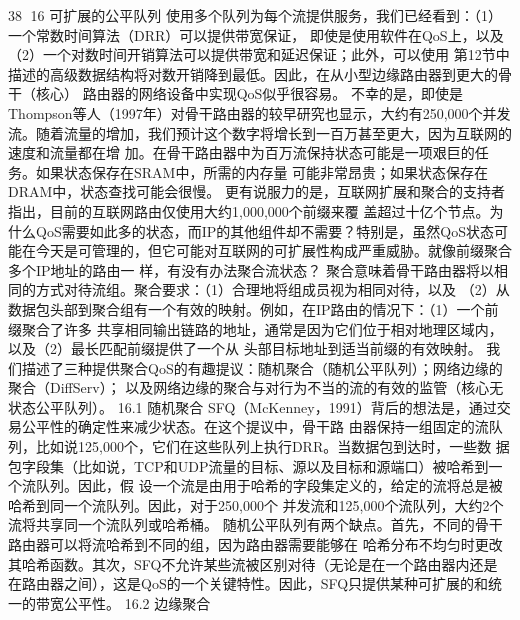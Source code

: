                                                                            38
16 可扩展的公平队列
使用多个队列为每个流提供服务，我们已经看到：（1）一个常数时间算法（DRR）可以提供带宽保证，
即使是使用软件在QoS上，以及（2）一个对数时间开销算法可以提供带宽和延迟保证；此外，可以使用
第12节中描述的高级数据结构将对数开销降到最低。因此，在从小型边缘路由器到更大的骨干（核心）
路由器的网络设备中实现QoS似乎很容易。
不幸的是，即使是Thompson等人（1997年）对骨干路由器的较早研究也显示，大约有250,000个并发
流。随着流量的增加，我们预计这个数字将增长到一百万甚至更大，因为互联网的速度和流量都在增
加。在骨干路由器中为百万流保持状态可能是一项艰巨的任务。如果状态保存在SRAM中，所需的内存量
可能非常昂贵；如果状态保存在DRAM中，状态查找可能会很慢。
更有说服力的是，互联网扩展和聚合的支持者指出，目前的互联网路由仅使用大约1,000,000个前缀来覆
盖超过十亿个节点。为什么QoS需要如此多的状态，而IP的其他组件却不需要？特别是，虽然QoS状态可
能在今天是可管理的，但它可能对互联网的可扩展性构成严重威胁。就像前缀聚合多个IP地址的路由一
样，有没有办法聚合流状态？
聚合意味着骨干路由器将以相同的方式对待流组。聚合要求：（1）合理地将组成员视为相同对待，以及
（2）从数据包头部到聚合组有一个有效的映射。例如，在IP路由的情况下：（1）一个前缀聚合了许多
共享相同输出链路的地址，通常是因为它们位于相对地理区域内，以及（2）最长匹配前缀提供了一个从
头部目标地址到适当前缀的有效映射。
我们描述了三种提供聚合QoS的有趣提议：随机聚合（随机公平队列）；网络边缘的聚合（DiffServ）；
以及网络边缘的聚合与对行为不当的流的有效的监管（核心无状态公平队列）。
16.1 随机聚合
SFQ（McKenney，1991）背后的想法是，通过交易公平性的确定性来减少状态。在这个提议中，骨干路
由器保持一组固定的流队列，比如说125,000个，它们在这些队列上执行DRR。当数据包到达时，一些数
据包字段集（比如说，TCP和UDP流量的目标、源以及目标和源端口）被哈希到一个流队列。因此，假
设一个流是由用于哈希的字段集定义的，给定的流将总是被哈希到同一个流队列。因此，对于250,000个
并发流和125,000个流队列，大约2个流将共享同一个流队列或哈希桶。
随机公平队列有两个缺点。首先，不同的骨干路由器可以将流哈希到不同的组，因为路由器需要能够在
哈希分布不均匀时更改其哈希函数。其次，SFQ不允许某些流被区别对待（无论是在一个路由器内还是
在路由器之间），这是QoS的一个关键特性。因此，SFQ只提供某种可扩展的和统一的带宽公平性。
16.2 边缘聚合

